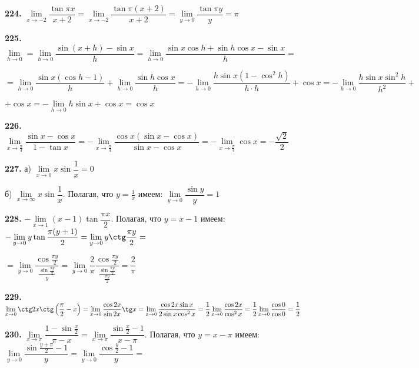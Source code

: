 \documentclass[12pt]{article}
\begin{document}
	\medskip
	{\bf 224.} $\lim\limits_{x\to-2} \dfrac{\tan \pi x}{x+2} = \lim\limits_{x\to -2} \dfrac{\tan \pi(x+2)}{x+2} = \lim\limits_{y\to 0} \dfrac{\tan \pi y}{y} = \pi$
	
	\medskip
	{\bf 225.} $\lim\limits_{h\to 0} = \lim\limits_{h\to 0} \dfrac{\sin(x+h)-\sin x}{h} = \lim\limits_{h\to 0}\dfrac{\sin x\cos h+ \sin h \cos x - \sin x}{h} = $
	
	$
	= \lim\limits_{h\to 0} \dfrac{\sin x(\cos h-1)}{h} + \lim\limits_{h\to 0} \dfrac{\sin h \cos x}{h} = - \lim\limits_{h\to 0} \dfrac{h\sin x(1-\cos^2 h)}{h\cdot h} + \cos x = - \lim\limits_{h\to 0} \dfrac{h\sin x\sin^2 h}{h^2}+
	$
	
	\vspace{2mm}
	$
	+\cos x = -\lim\limits_{h\to 0} h\sin x  + \cos x = \cos x
	$
	
	\medskip
	{\bf 226.} $\lim\limits_{x\to \frac{\pi}{4}} \dfrac{\sin x-\cos x}{1-\tan x} = - \lim\limits_{x\to \frac{\pi}{4}} \dfrac{\cos x(\sin x-\cos x)}{\sin x-\cos x} = - \lim\limits_{x\to \frac{\pi}{4}} \cos x = -\dfrac{\sqrt{2}}{2}$
	
	\medskip
	{\bf 227.} а) $\lim\limits_{x\to 0} x\sin\dfrac{1}{x} = 0$
	
	\quad б) $\lim\limits_{x\to\infty} x\sin \dfrac{1}{x}$. Полагая, что $y=\frac{1}{x}$ имеем: $\lim\limits_{y\to0} \dfrac{\sin y}{y}  = 1$
	
	\medskip
	{\bf 228.} $-\lim\limits_{x\to 1} (x-1)\tan\dfrac{\pi x}{2}$.  Полагая, что $y=x-1$ имеем: $-\lim\limits_{y\to 0}y\tan \dfrac{\pi (y+1)}{2} = \lim\limits_{y\to0} y\ctg\dfrac{\pi y}{2} =$
	
	$
	=\lim\limits_{y\to0} \dfrac{\cos\frac{\pi y}{2}}{\frac{\sin\frac{\pi y}{2}}{y}} = \lim\limits_{y\to0} \dfrac{2}{\pi} \dfrac{\cos \frac{\pi y}{2}}{\frac{\sin \frac{\pi y}{2}}{\frac{\pi y}{2}}} =  \dfrac{2}{\pi}
	$
	
	\medskip
	{\bf 229.} $\lim\limits_{x\to0} \ctg 2x \ctg \left(\dfrac{\pi}{2}-x\right) = \lim\limits_{x\to0} \dfrac{\cos 2x}{\sin 2x} \tg x = \lim\limits_{x\to0} \dfrac{\cos 2x \sin x}{2\sin x\cos^2 x } = \dfrac{1}{2}\lim\limits_{x\to0} \dfrac{\cos 2x}{\cos^2 x} =\dfrac{1}{2}\lim\limits_{x\to0} \dfrac{\cos 0}{\cos 0}= \dfrac{1}{2}$
	
	\medskip
	{\bf 230.} $\lim\limits_{x\to\pi}\dfrac{1-\sin\frac{x}{2}}{\pi-x} = \lim\limits_{x\to\pi} \dfrac{\sin \frac{x}{2}-1}{x-\pi}$. Полагая, что $y=x-\pi$ имеем: $\lim\limits_{y\to0} \dfrac{\sin \frac{y+\pi}{2}-1}{y} = \lim\limits_{y\to0} \dfrac{\cos \frac{y}{2}-1}{y} =$
	
\end{document}
